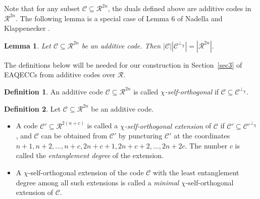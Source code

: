 \documentclass{article}
\newtheorem{lem}{Lemma}[section]
\theoremstyle{remark}
\theoremstyle{definition}
\newtheorem{defin}{Definition}[section]
\numberwithin{equation}{section}
\begin{document}
Note that for any subset $\mathcal{C} \subseteq \mathcal{R}^{2n}$, the duals defined above are additive codes in $\mathcal{R}^{2n}.$ The following lemma is a special case of Lemma 6 of Nadella and Klappenecker  \cite{nadella}.

\begin{lem}\label{card}  Let $\mathcal{C} \subseteq \mathcal{R}^{2n}$ be an additive code. Then
 $|\mathcal{C}||\mathcal{C}^{\perp_\chi}|=|\mathcal{R}^{2n}|.$
 \end{lem} 

The definitions below will be needed for our construction in Section~\ref{sec3} of EAQECCs from additive codes over $\mathcal{R}$.

\begin{defin}
\label{def:chi-self-ortho}
An additive code $\mathcal{C} \subseteq \mathcal{R}^{2n}$ is called \emph{$\chi$-self-orthogonal} if $\mathcal{C} \subseteq \mathcal{C}^{\perp_\chi}$.
\end{defin}

\begin{defin} \label{def:chi-ext}
 Let $\mathcal{C} \subseteq \mathcal{R}^{2n}$ be an additive code.
\begin{itemize}
\item A code $\mathcal{C}' \subseteq \mathcal{R}^{2(n+c)}$ is called a \emph{$\chi$-self-orthogonal extension} of $\mathcal{C}$ if $\mathcal{C}' \subseteq \mathcal{C}'^{\perp_\chi}$, and $\mathcal{C}$ can be obtained from $\mathcal{C}' $ by puncturing $\mathcal{C}' $ at the coordinates $n+1,n+2,\ldots,n+c, 2n+c+1,2n+c+2,\ldots,2n+2c$. The number $c$ is called the \emph{entanglement degree} of the extension.

\item A $\chi$-self-orthogonal extension of the code $\mathcal{C}$ with the least entanglement degree among all such extensions is called a \emph{minimal} $\chi$-self-orthogonal extension of $\mathcal{C}.$ %
\end{itemize}
\end{defin}
\end{document}
